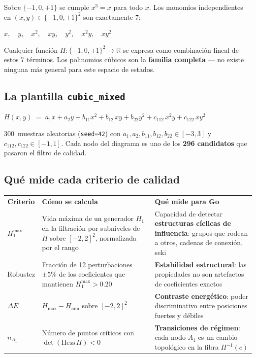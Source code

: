 \documentclass[11pt, a4paper]{article}
\newcommand{\TH}[1]{\cellcolor{cTHbg}\color{white}\textbf{#1}}
\begin{document}
Sobre $\{-1, 0, +1\}$ se cumple $x^3 = x$ para todo $x$. Los monomios
independientes en $(x,y)\in\{-1,0,+1\}^2$ son exactamente 7:

\begin{tcolorbox}[codebox]
$x, \quad y, \quad x^2, \quad xy, \quad y^2, \quad x^2y, \quad xy^2$
\end{tcolorbox}

Cualquier funci\'on $H\colon\{-1,0,+1\}^2\to\mathbb{R}$ se expresa como
combinaci\'on lineal de estos 7 t\'erminos. Los polinomios c\'ubicos son la
\textbf{familia completa} --- no existe ninguna m\'as general para este espacio
de estados.

\subsection{La plantilla \texttt{cubic\_mixed}}

\begin{tcolorbox}[codebox]
$H(x,y) \;=\; a_1 x + a_2 y + b_{11} x^2 + b_{12}\,xy + b_{22} y^2
              + c_{112}\,x^2y + c_{122}\,xy^2$
\end{tcolorbox}

300~muestras aleatorias (\texttt{seed=42}) con
$a_1,a_2,b_{11},b_{12},b_{22}\in[-3,3]$ y $c_{112},c_{122}\in[-1,1]$.
Cada nodo del diagrama es uno de los \textbf{296 candidatos} que pasaron
el filtro de calidad.

\subsection{Qu\'e mide cada criterio de calidad}

\medskip
\begin{center}
\begin{tabularx}{0.96\textwidth}{L{2.3cm}L{3.8cm}X}
  \TH{Criterio} & \TH{C\'omo se calcula} & \TH{Qu\'e mide para Go} \\[1pt]
  $H_1^{\max}$
    & Vida m\'axima de un generador $H_1$ en la filtraci\'on por subniveles
      de $H$ sobre $[-2,2]^2$, normalizada por el rango
    & Capacidad de detectar \textbf{estructuras c\'iclicas de influencia}:
      grupos que rodean a otros, cadenas de conexi\'on, seki \\
  Robustez
    & Fracci\'on de 12 perturbaciones $\pm5\%$ de los coeficientes que
      mantienen $H_1^{\max}>0.20$
    & \textbf{Estabilidad estructural}: las propiedades no son artefactos
      de coeficientes exactos \\
  $\Delta E$
    & $H_{\max}-H_{\min}$ sobre $[-2,2]^2$
    & \textbf{Contraste energ\'etico}: poder discriminativo entre posiciones
      fuertes y d\'ebiles \\
  $n_{A_1}$
    & N\'umero de puntos cr\'iticos con $\det(\mathrm{Hess}\,H)<0$
    & \textbf{Transiciones de r\'egimen}: cada nodo $A_1$ es un cambio
      topol\'ogico en la fibra $H^{-1}(c)$ \\
\end{tabularx}
\end{center}
\medskip
\end{document}
